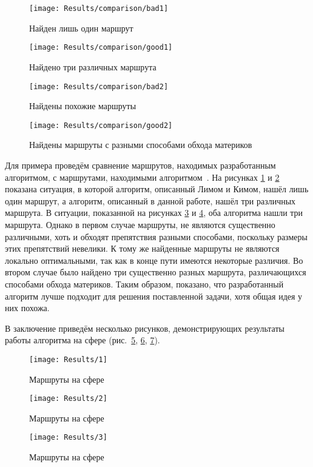 \begin{figure}
    \texttt{[image: Results/comparison/bad1]}
    \caption{Найден лишь один маршрут}
    \label{fig:res-comp-bad1}
\end{figure}

\begin{figure}
    \texttt{[image: Results/comparison/good1]}
    \caption{Найдено три различных маршрута}
    \label{fig:res-comp-good1}
\end{figure}

\begin{figure}
    \texttt{[image: Results/comparison/bad2]}
    \caption{Найдены похожие маршруты}
    \label{fig:res-comp-bad2}
\end{figure}

\begin{figure}
    \texttt{[image: Results/comparison/good2]}
    \caption{Найдены маршруты с разными способами обхода материков}
    \label{fig:res-comp-good2}
\end{figure}

Для примера проведём сравнение маршрутов, находимых разработанным
алгоритмом, с маршрутами, находимыми
алгоритмом~\cite{lim2005shortest}. На рисунках \ref{fig:res-comp-bad1}
и \ref{fig:res-comp-good1} показана ситуация, в которой алгоритм,
описанный Лимом и Кимом, нашёл лишь один маршрут, а алгоритм,
описанный в данной работе, нашёл три различных маршрута. В ситуации,
показанной на рисунках \ref{fig:res-comp-bad2} и
\ref{fig:res-comp-good2}, оба алгоритма нашли три маршрута. Однако в
первом случае маршруты, не являются существенно различными, хоть и
обходят препятствия разными способами, поскольку размеры этих
препятствий невелики. К тому же найденные маршруты не являются
локально оптимальными, так как в конце пути имеются некоторые
различия. Во втором случае было найдено три существенно разных
маршрута, различающихся способами обхода материков. Таким образом,
показано, что разработанный алгоритм лучше подходит для решения
поставленной задачи, хотя общая идея у них похожа.

В заключение приведём несколько рисунков, демонстрирующих результаты
работы алгоритма на сфере (рис.~\ref{fig:result1}, \ref{fig:result2},
\ref{fig:result3}).

\begin{figure}
    \texttt{[image: Results/1]}
    \caption{Маршруты на сфере}
    \label{fig:result1}
\end{figure}

\begin{figure}
    \texttt{[image: Results/2]}
    \caption{Маршруты на сфере}
    \label{fig:result2}
\end{figure}

\begin{figure}
    \texttt{[image: Results/3]}
    \caption{Маршруты на сфере}
    \label{fig:result3}
\end{figure}

\FloatBarrier

